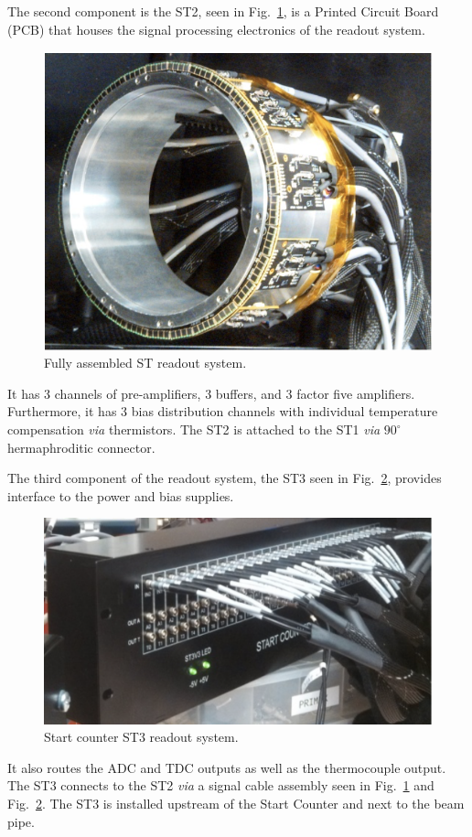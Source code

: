 The second component is the ST2, seen in Fig.~\ref{fig:stfullreadout}, is a Printed Circuit Board (PCB) that houses the signal processing electronics of the readout system.  
	\begin{figure}[!htb]
		\centering
		\includegraphics[width=1.0\columnwidth]{design/figs/st_full_readout}
		\caption{Fully assembled ST readout system.}
		\label{fig:stfullreadout}
	\end{figure}
It has 3 channels of pre-amplifiers, 3 buffers, and 3 factor five amplifiers.  Furthermore, it has 3 bias distribution channels with individual temperature compensation \emph{via} thermistors.  The ST2 is attached to the ST1 \emph{via} $90^{\circ}$ hermaphroditic connector.  

The third component of the readout system, the ST3 seen in Fig.~\ref{fig:st3}, provides interface to the power and bias supplies.
	\begin{figure}[!htb]
		\centering
		\includegraphics[width=1.0\columnwidth]{design/figs/st3}
		\caption{Start counter ST3 readout system.}
		\label{fig:st3}
	\end{figure}
It also routes the ADC and TDC outputs as well as the thermocouple output.  The ST3 connects to the ST2 \emph{via} a signal cable assembly seen in Fig.~\ref{fig:stfullreadout} and Fig.~\ref{fig:st3}.  The ST3 is installed upstream of the Start Counter and next to the beam pipe.

